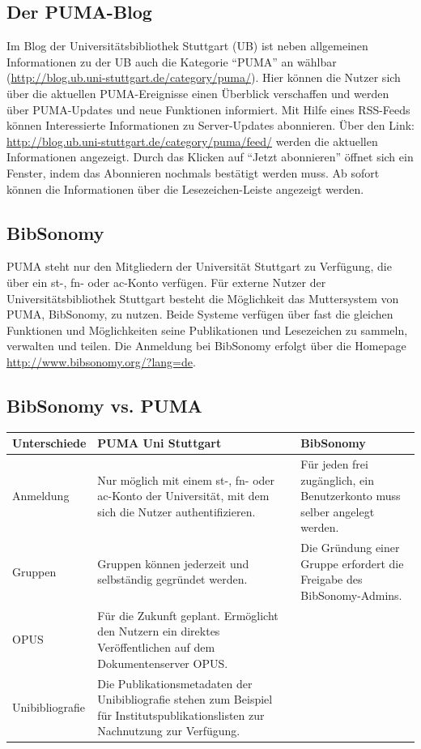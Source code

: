 \subsection{Der PUMA-Blog}
Im Blog der Universitätsbibliothek Stuttgart (UB) ist neben allgemeinen Informationen zu der UB auch die Kategorie \enquote{PUMA} an wählbar (\url{http://blog.ub.uni-stuttgart.de/category/puma/}). Hier können die Nutzer sich über die aktuellen PUMA-Ereignisse einen Überblick verschaffen und werden über PUMA-Updates und neue Funktionen informiert.\newline
Mit Hilfe eines RSS-Feeds können Interessierte Informationen zu Server-Updates abonnieren. Über den Link: \url{http://blog.ub.uni-stuttgart.de/category/puma/feed/} werden die aktuellen Informationen angezeigt. Durch das Klicken auf \enquote{Jetzt abonnieren} öffnet sich ein Fenster, indem das Abonnieren nochmals bestätigt werden muss. Ab sofort können die Informationen über die Lesezeichen-Leiste angezeigt werden. 
\subsection{BibSonomy}
PUMA steht nur den Mitgliedern der Universität Stuttgart zu Verfügung, die über ein st-, fn- oder ac-Konto  verfügen. Für externe Nutzer der Universitätsbibliothek Stuttgart besteht die Möglichkeit das Muttersystem von PUMA, BibSonomy, zu nutzen. Beide Systeme verfügen über fast die gleichen Funktionen und Möglichkeiten seine Publikationen und Lesezeichen zu sammeln, verwalten und teilen. \newline
Die Anmeldung bei BibSonomy erfolgt über die Homepage \url{http://www.bibsonomy.org/?lang=de}.  

\subsection{BibSonomy vs. PUMA}
\begin{tabu}{|X|X|X|} \hline
	\bfseries Unterschiede & \bfseries PUMA Uni Stuttgart & \bfseries BibSonomy\\ \hline
	Anmeldung& Nur möglich mit einem st-, fn- oder ac-Konto der Universität, mit dem sich die Nutzer authentifizieren.  & Für jeden frei zugänglich, ein Benutzerkonto muss selber angelegt werden. \\ \hline
	 Gruppen & Gruppen können jederzeit und selbständig gegründet werden. & Die Gründung einer Gruppe erfordert die Freigabe des BibSonomy-Admins. \\ \hline
	OPUS & Für die Zukunft geplant. Ermöglicht den Nutzern ein direktes Veröffentlichen auf dem Dokumentenserver OPUS. & \\ \hline
	Unibibliografie& Die Publikationsmetadaten der Unibibliografie stehen zum Beispiel für Institutspublikationslisten zur Nachnutzung zur Verfügung.&\\ \hline
\end{tabu}

